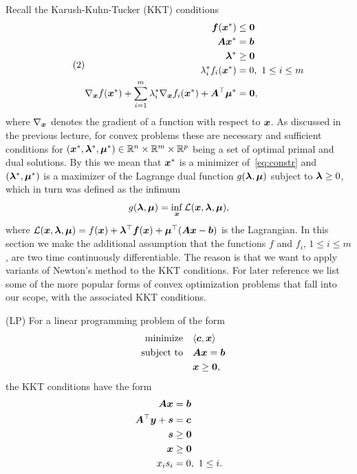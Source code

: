 Recall the Karush-Kuhn-Tucker (KKT) conditions
\begin{align}\label{eq:kkt}\tag{2}
\begin{split}
  \bm{f}(\bm{x}^*) & \leq \bm{0}\\
  \bm{A}\bm{x}^* & = \bm{b}\\
  \bm{\lambda}^*&\geq \bm{0}\\
  \lambda_i^*f_i(\bm{x}^*) & =0, \ 1\leq i\leq m\\
  \nabla_{\bm{x}} f(\bm{x}^*)+\sum_{i=1}^m \lambda_i^* \nabla_{\bm{x}}f_i(\bm{x}^*)+\bm{A}^{\top}\bm{\mu}^* &= \bm{0},
 \end{split}
 \end{align}
where $\nabla_{\bm{x}}$ denotes the gradient of a function with respect to $\bm{x}$.
 As discussed in the previous lecture, for convex problems these are necessary and sufficient conditions for $(\bm{x}^*,\bm{\lambda}^*,\bm{\mu}^*)\in \mathbb{R}^{n}\times \mathbb{R}^m\times \mathbb{R}^p$ being a set of optimal primal and dual solutions. By this we mean that $\bm{x}^*$ is a minimizer of~\eqref{eq:constr} and $(\bm{\lambda}^*,\bm{\mu}^*)$ is a maximizer of the Lagrange dual function $g(\bm{\lambda},\bm{\mu})$ subject to $\bm{\lambda}\geq 0$, which in turn was defined as the infimum
 \begin{equation*}
  g(\bm{\lambda},\bm{\mu}) = \inf_{\bm{x}} \mathcal{L}(\bm{x},\bm{\lambda},\bm{\mu}),
 \end{equation*}
where $\mathcal{L}(\bm{x},\bm{\lambda},\bm{\mu})=f(\bm{x})+\bm{\lambda}^{\top}\bm{f}(\bm{x})+\bm{\mu}^{\top}(\bm{A}\bm{x}-\bm{b})$ is the Lagrangian. In this section we make the additional assumption that the functions $f$ and $f_i$, $1\leq i\leq m$, are two time continuously differentiable. The reason is that we want to apply variants of Newton's method to the KKT conditions.
For later reference we list some of the more popular forms of convex optimization problems that fall into our scope, with the associated KKT conditions.

\begin{example}(LP) For a linear programming problem of the form
\begin{align*}
\text{minimize}\quad & \langle {\bm{c}}, {\bm{x}} \rangle\\
\quad\text{subject to}\quad & \bm{A}\bm{x}=\bm{b}\\
& \bm{x}\geq \bm{0},
\end{align*}
the KKT conditions have the form
\begin{align*}
 \bm{A}\bm{x}&=\bm{b}\\
 \bm{A}^{\top}\bm{y}+\bm{s}&=\bm{c}\\
 \bm{s} & \geq \bm{0}\\
 \bm{x} & \geq \bm{0}\\
 x_is_i&=0, \ 1\leq i.
\end{align*}
\end{example}

